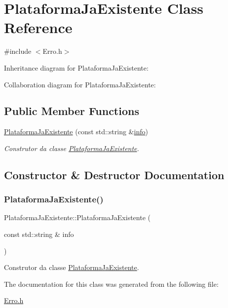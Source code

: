 \hypertarget{class_plataforma_ja_existente}{}\section{Plataforma\+Ja\+Existente Class Reference}
\label{class_plataforma_ja_existente}


{\ttfamily \#include $<$Erro.\+h$>$}



Inheritance diagram for Plataforma\+Ja\+Existente\+:


Collaboration diagram for Plataforma\+Ja\+Existente\+:
\subsection*{Public Member Functions}
\begin{DoxyCompactItemize}
\item 
\mbox{\hyperlink{class_plataforma_ja_existente_a471bf73973470d778c2442a8adc17e89}{Plataforma\+Ja\+Existente}} (const std\+::string \&\mbox{\hyperlink{class_erro_a3ecaaf6f8e15a0830a648035b456cb62}{info}})
\begin{DoxyCompactList}\small\item\em Construtor da classe \mbox{\hyperlink{class_plataforma_ja_existente}{Plataforma\+Ja\+Existente}}. \end{DoxyCompactList}\end{DoxyCompactItemize}


\subsection{Constructor \& Destructor Documentation}
\mbox{\label{class_plataforma_ja_existente_a471bf73973470d778c2442a8adc17e89}} 
\subsubsection{\texorpdfstring{Plataforma\+Ja\+Existente()}{PlataformaJaExistente()}}
{\footnotesize\ttfamily Plataforma\+Ja\+Existente\+::\+Plataforma\+Ja\+Existente (\begin{DoxyParamCaption}\item[{const std\+::string \&}]{info }\end{DoxyParamCaption})\hspace{0.3cm}{\ttfamily [inline]}}



Construtor da classe \mbox{\hyperlink{class_plataforma_ja_existente}{Plataforma\+Ja\+Existente}}. 



The documentation for this class was generated from the following file\+:\begin{DoxyCompactItemize}
\item 
\mbox{\hyperlink{_erro_8h}{Erro.\+h}}\end{DoxyCompactItemize}
